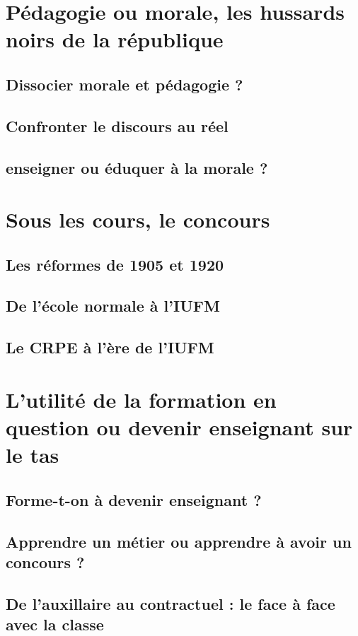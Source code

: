 \documentclass[a4paper,11pt]{article}
\begin{document}
\section{Pédagogie ou morale, les hussards noirs de la république}

			\subsection{Dissocier morale et pédagogie ?}
			\subsection{Confronter le discours au réel}
			\subsection{enseigner ou éduquer à la morale ?}

\section{Sous les cours, le concours}

			\subsection{Les réformes de 1905 et 1920}
			\subsection{De l'école normale à l'IUFM}
			\subsection{Le CRPE à l'ère de l'IUFM}
			
\section{L'utilité de la formation en question ou devenir enseignant sur le tas}

			\subsection{Forme-t-on à devenir enseignant ?}
			\subsection{Apprendre un métier ou apprendre à avoir un concours ?}
			\subsection{De l'auxillaire au contractuel : le face à face avec la classe}
\end{document}
